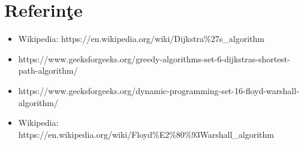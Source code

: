 \documentclass{article}
\begin{document}
\clearpage

\section{Referin\c{t}e}
\begin{itemize}
\item Wikipedia: https://en.wikipedia.org/wiki/Dijkstra\%27s\_algorithm
\item https://www.geeksforgeeks.org/greedy-algorithms-set-6-dijkstras-shortest-path-algorithm/
\item https://www.geeksforgeeks.org/dynamic-programming-set-16-floyd-warshall-algorithm/
\item Wikipedia: https://en.wikipedia.org/wiki/Floyd\%E2\%80\%93Warshall\_algorithm

\end{itemize}
\end{document}
